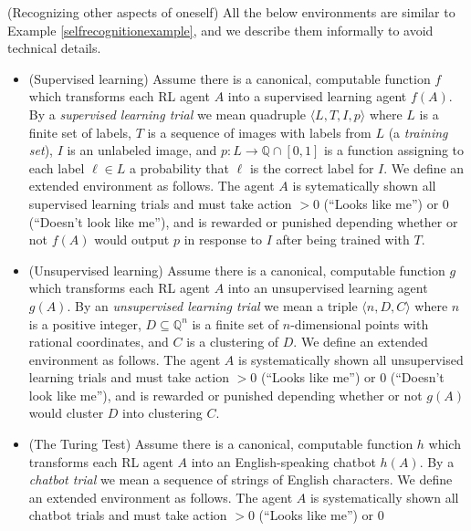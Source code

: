 \documentclass[runningheads]{llncs}
\begin{document}
\begin{example}
\label{otheraspectsexample}
    (Recognizing other aspects of oneself)
    All the below environments are similar to Example \ref{selfrecognitionexample},
    and we describe them informally to avoid technical details.
    \begin{itemize}
        \item
        (Supervised learning)
        Assume there is a canonical, computable function $f$ which transforms
        each RL agent $A$ into a supervised learning agent $f(A)$. By a \emph{supervised
        learning trial} we mean quadruple $\langle L,T,I,p\rangle$ where $L$ is a finite set
        of labels, $T$ is a sequence of images with labels from $L$ (a \emph{training set}),
        $I$ is an unlabeled image, and $p:L\to \mathbb Q\cap [0,1]$ is a function
        assigning to each label $\ell\in L$ a probability that $\ell$ is the correct label
        for $I$. We define an extended environment as follows.
        The agent $A$ is sytematically shown all supervised learning trials and must
        take action $>0$ (``Looks like me'') or $0$ (``Doesn't look like me''), and is
        rewarded or punished depending whether or not $f(A)$ would
        output $p$ in response to $I$ after being trained with $T$.
        \item
        (Unsupervised learning)
        Assume there is a canonical, computable function $g$ which transforms each RL
        agent $A$ into an unsupervised learning agent $g(A)$.
        By an \emph{unsupervised learning trial} we mean a triple
        $\langle n,D,C\rangle$ where $n$ is a positive integer, $D\subseteq \mathbb Q^n$
        is a finite set of $n$-dimensional points with rational coordinates, and $C$
        is a clustering of $D$.
        We define an extended environment as follows. The agent $A$ is systematically
        shown all unsupervised learning trials and must take action $>0$ (``Looks like me'')
        or $0$ (``Doesn't look like me''), and is rewarded or punished depending
        whether or not $g(A)$ would cluster $D$ into clustering $C$.
        \item
        (The Turing Test)
        Assume there is a canonical, computable function $h$ which transforms each RL
        agent $A$ into an English-speaking chatbot $h(A)$.
        By a \emph{chatbot trial} we mean a sequence of strings of English characters.
        We define an extended environment as follows. The agent $A$ is systematically
        shown all chatbot trials and must take action $>0$ (``Looks like me'') or $0$

\end{itemize}
\end{example}
\end{document}

